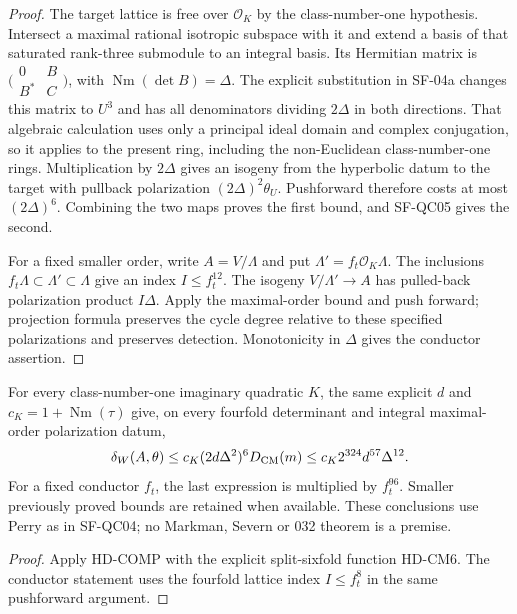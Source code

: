 \begin{proof}
The target lattice is free over $\mathcal O_K$ by the
class-number-one hypothesis. Intersect a maximal rational
isotropic subspace with it and extend a basis of that saturated
rank-three submodule to an integral basis. Its Hermitian matrix
is $\bigl(\begin{smallmatrix}0&B\\B^*&C\end{smallmatrix}\bigr)$,
with $\operatorname{Nm}(\det B)=\Delta$. The explicit substitution
in SF-04a changes this matrix to $U^3$ and has all denominators
dividing $2\Delta$ in both directions. That algebraic calculation
uses only a principal ideal domain and complex conjugation, so it
applies to the present ring, including the non-Euclidean
class-number-one rings. Multiplication by $2\Delta$ gives an
isogeny from the hyperbolic datum to the target with pullback
polarization $(2\Delta)^2\theta_U$. Pushforward therefore costs
at most $(2\Delta)^6$. Combining the two maps proves the first
bound, and SF-QC05 gives the second.

For a fixed smaller order, write $A=V/\Lambda$ and put
$\Lambda'=f_t\mathcal O_K\Lambda$. The inclusions
$f_t\Lambda\subset\Lambda'\subset\Lambda$ give an index
$I\le f_t^{12}$. The isogeny $V/\Lambda'\to A$ has pulled-back
polarization product $I\Delta$. Apply the maximal-order bound
and push forward; projection formula preserves the cycle degree
relative to these specified polarizations and preserves detection.
Monotonicity in $\Delta$ gives the conductor assertion.
\end{proof}

\begin{corollary}
\label{HD-CM4}
For every class-number-one imaginary quadratic $K$, the same
explicit $d$ and $c_K=1+\operatorname{Nm}(\tau)$ give, on every
fourfold determinant and integral maximal-order polarization datum,
\[
 \delta_W(A,\theta)\le
 c_K(2d\Delta^2)^6D_{\rm CM}(m)
 \le c_K2^{324}d^{57}\Delta^{12}.
\]
For a fixed conductor $f_t$, the last expression is multiplied
by $f_t^{96}$. Smaller previously proved bounds are retained
when available. These conclusions use Perry as in SF-QC04;
no Markman, Severn or 032 theorem is a premise.
\end{corollary}
\begin{proof}
Apply HD-COMP with the explicit split-sixfold function HD-CM6.
The conductor statement uses the fourfold lattice index
$I\le f_t^8$ in the same pushforward argument.
\end{proof}
